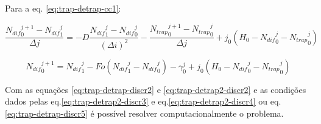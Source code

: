 Para a eq. \ref{eq:trap-detrap-cc1}:

\begin{equation*}
\dfrac{{N_{dif}}_{0}^{j+1} - {N_{dif}}_{1}^{j}}{\Delta j} = -D \dfrac{{N_{dif}}_{1}^{j} - {N_{dif}}_0^{j}}{(\Delta i)^2} - \dfrac{{N_{trap}}_0^{j+1} - {N_{trap}}_0^{j}}{\Delta j} + j_{0}\left(H_0-{N_{dif}}_0^{j}-{N_{trap}}_0^j\right)
\end{equation*} 

\begin{equation}
\label{eq:trap-detrap-discr5}
{N_{dif}}_{0}^{j+1} = {N_{dif}}_{1}^{j} - Fo({N_{dif}}_{1}^{j} - {N_{dif}}_0^{j}) - \gamma_0^j +j_{0}\left(H_0-{N_{dif}}_0^{j}-{N_{trap}}_0^j\right)
\end{equation} 

Com as equações \autoref{eq:trap-detrap-discr2} e \autoref{eq:trap-detrap2-discr2} e as condições dados pelas eq.\ref{eq:trap-detrap2-discr3} e eq.\ref{eq:trap-detrap2-discr4} ou eq.\ref{eq:trap-detrap-discr5} é possível resolver computacionalmente o problema.